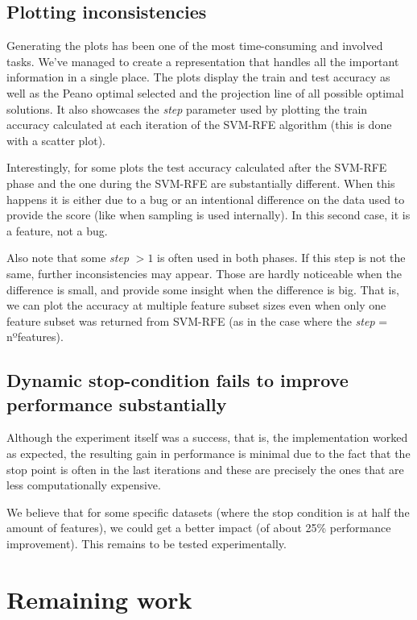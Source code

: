 \subsection{Plotting inconsistencies}
Generating the plots has been one of the most time-consuming and involved tasks. We've managed to create a representation that handles all the important information in a single place. The plots display the train and test accuracy as well as the Peano optimal selected and the projection line of all possible optimal solutions. It also showcases the \emph{step} parameter used by plotting the train accuracy calculated at each iteration of the SVM-RFE algorithm (this is done with a scatter plot).

Interestingly, for some plots the test accuracy calculated after the SVM-RFE phase and the one during the SVM-RFE are substantially different. When this happens it is either due to a bug or an intentional difference on the data used to provide the score (like when sampling is used internally). In this second case, it is a feature, not a bug.

Also note that some \emph{step} $> 1$ is often used in both phases. If this step is not the same, further inconsistencies may appear. Those are hardly noticeable when the difference is small, and provide some insight when the difference is big. That is, we can plot the accuracy at multiple feature subset sizes even when only one feature subset was returned from SVM-RFE (as in the case where the \emph{step} = nºfeatures).

\subsection{Dynamic stop-condition fails to improve performance substantially}
Although the experiment itself was a success, that is, the implementation worked as expected, the resulting gain in performance is minimal due to the fact that the stop point is often in the last iterations and these are precisely the ones that are less computationally expensive.

We believe that for some specific datasets (where the stop condition is at half the amount of features), we could get a better impact (of about 25\% performance improvement). This remains to be tested experimentally.

\section{Remaining work}

